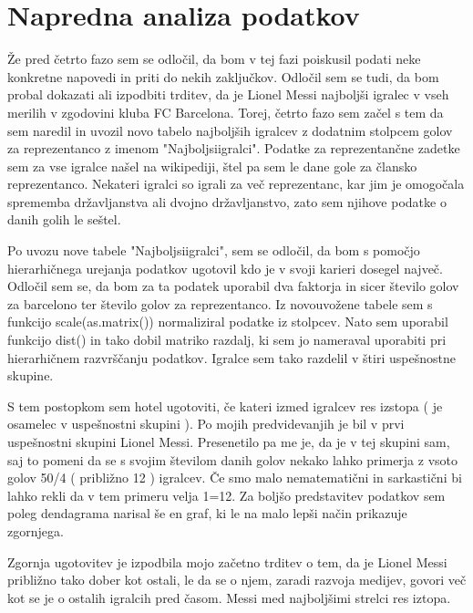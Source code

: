 \documentclass[11pt,a4paper]{article}
\begin{document}

\section{Napredna analiza podatkov}

Že pred četrto fazo sem se odločil, da bom v tej fazi poiskusil podati neke konkretne napovedi in priti do nekih zaključkov. Odločil sem se tudi, da bom probal dokazati ali izpodbiti trditev, da je Lionel Messi najboljši igralec v vseh merilih v zgodovini kluba FC Barcelona. Torej, četrto fazo sem začel s tem da sem naredil in uvozil novo tabelo najboljših igralcev z dodatnim stolpcem golov za reprezentanco z imenom "Najboljsiigralci". Podatke za reprezentančne zadetke sem za vse igralce našel na wikipediji, štel pa sem le dane gole za člansko reprezentanco. Nekateri igralci so igrali za več reprezentanc, kar jim je omogočala sprememba državljanstva ali dvojno državljanstvo, zato sem njihove podatke o danih golih le seštel. 

Po uvozu nove tabele "Najboljsiigralci", sem se odločil, da bom s pomočjo hierarhičnega urejanja podatkov ugotovil kdo je v svoji karieri dosegel največ. Odločil sem se, da bom za ta podatek uporabil dva faktorja in sicer število golov za barcelono ter število golov za reprezentanco. Iz novouvožene tabele sem s funkcijo scale(as.matrix()) normaliziral podatke iz stolpcev. Nato sem uporabil funkcijo dist() in tako dobil matriko razdalj, ki sem jo nameraval uporabiti pri hierarhičnem razvrščanju podatkov. Igralce sem tako razdelil v štiri uspešnostne skupine. 

\newpage
S tem postopkom sem hotel ugotoviti, če kateri izmed igralcev res izstopa ( je osamelec v uspešnostni skupini ). Po mojih predvidevanjih je bil v prvi uspešnostni skupini Lionel Messi. Presenetilo pa me je, da je v tej skupini sam, saj to pomeni da se s svojim številom danih golov nekako lahko primerja z vsoto golov 50/4 ( približno 12 ) igralcev. Če smo malo nematematični in sarkastični bi lahko rekli da v tem primeru velja 1=12. Za boljšo predstavitev podatkov sem poleg dendagrama narisal še en graf, ki le na malo lepši način prikazuje zgornjega. 

\newpage
Zgornja ugotovitev je izpodbila mojo začetno trditev o tem, da je Lionel Messi približno tako dober kot ostali, le da se o njem, zaradi razvoja medijev, govori več kot se je o ostalih igralcih pred časom. Messi med najboljšimi strelci res iztopa.
\end{document}
